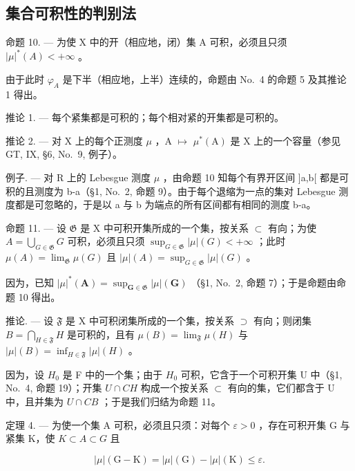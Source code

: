 \subsection{集合可积性的判别法}

命题 10. --- 为使 X 中的开（相应地，闭）集 A 可积，必须且只须 \(|\mu|^{*}(A)<+\infty\) 。

由于此时 \(\varphi_{A}\) 是下半（相应地，上半）连续的，命题由 No.~4 的命题 5 及其推论 1 得出。

推论 1. --- 每个紧集都是可积的；每个相对紧的开集都是可积的。

推论 2. --- 对 X 上的每个正测度 \(\mu\) ，A \(\mapsto\) \(\mu^{*}(\mathrm{A})\) 是 X 上的一个容量（参见 GT, IX, §6, No.~9, 例子）。

例子. --- 对 R 上的 Lebesgue 测度 \(\mu\) ，由命题 10 知每个有界开区间 {]}a,b{[} 都是可积的且测度为 b-a（§1, No.~2, 命题 9）。由于每个退缩为一点的集对 Lebesgue 测度都是可忽略的，于是以 a 与 b 为端点的所有区间都有相同的测度 b-a。

命题 11. --- 设 \(\mathfrak{G}\) 是 X 中可积开集所成的一个集，按关系 \(\subset\) 有向；为使 \(A = \bigcup_{G \in \mathfrak{G}} G\) 可积，必须且只须 \(\sup_{G \in \mathfrak{G}} |\mu|(G) < +\infty\) ；此时 \(\mu(A) = \lim_{\mathfrak{G}} \mu(G)\) 且 \(|\mu|(A) = \sup_{G \in \mathfrak{G}} |\mu|(G)\) 。

因为，已知 \(|\mu|^*(\mathbf{A}) = \sup_{\mathbf{G} \in \mathfrak{G}} |\mu|(\mathbf{G})\) （§1, No.~2, 命题 7）；于是命题由命题 10 得出。

推论. --- 设 \(\mathfrak{F}\) 是 X 中可积闭集所成的一个集，按关系 \(\supset\) 有向；则闭集 \(B = \bigcap_{H \in \mathfrak{F}} H\) 是可积的，且有 \(\mu(B) = \lim_{\mathfrak{F}} \mu(H)\) 与 \(|\mu|(B) = \inf_{H \in \mathfrak{F}} |\mu|(H)\) 。

因为，设 \(H_{0}\) 是 F 中的一个集；由于 \(H_{0}\) 可积，它含于一个可积开集 U 中（§1, No.~4, 命题 19）；开集 \(U \cap CH\) 构成一个按关系 \(\subset\) 有向的集，它们都含于 U 中，且并集为 \(U \cap CB\) ；于是我们归结为命题 11。

定理 4. --- 为使一个集 A 可积，必须且只须：对每个 \(\varepsilon > 0\) ，存在可积开集 G 与紧集 K，使 \(K \subset A \subset G\) 且

\[
| \mu | (\mathrm{G} - \mathrm{K}) = | \mu | (\mathrm{G}) - | \mu | (\mathrm{K}) \leqslant \varepsilon .
\]

